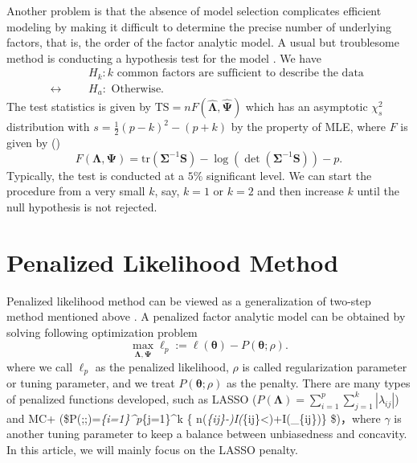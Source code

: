 \documentclass[
  a4paper,
  oneside,
  openany,
  12pt,
  onecolumn,
  twoside]{book}
\theoremstyle{plain}
\theoremstyle{remark}
\begin{document}
Another problem is that the absence of model selection complicates
efficient modeling by making it difficult to determine the precise
number of underlying factors, that is, the order of the factor analytic
model. A usual but troublesome method is conducting a hypothesis test
for the model \citep{mardiaMultivariateAnalysis1979}. We have
\begin{align*}
  &&&H_k: k \text{ common factors are sufficient to describe the data } \\
  \longleftrightarrow &&&H_a: \text{ Otherwise}.
\end{align*} The test statistics is given by
\(\text{TS}=nF(\hat{\boldsymbol{\Lambda}},\hat{\boldsymbol{\Psi}})\)
which has an asymptotic \(\chi^2_s\) distribution with
\(s=\frac{1}{2}(p-k)^2-(p+k)\) by the property of MLE, where \(F\) is
given by (\citet{mardiaMultivariateAnalysis1979}) \[
F(\boldsymbol{\Lambda},\boldsymbol{\Psi})=\text{tr}(\boldsymbol{\Sigma}^{-1}\boldsymbol{S})-\log(\det(\boldsymbol{\Sigma}^{-1}\boldsymbol{S}))-p.
\] Typically, the test is conducted at a \(5\%\) significant level. We
can start the procedure from a very small \(k\), say, \(k=1\) or \(k=2\)
and then increase \(k\) until the null hypothesis is not rejected.

\section{Penalized Likelihood Method}\label{penalized-likelihood-method}

Penalized likelihood method can be viewed as a generalization of
two-step method mentioned above
\citep{hiroseSparseEstimationNonconcave2015}. A penalized factor
analytic model can be obtained by solving following optimization problem
\[
 \max_{\boldsymbol{\Lambda},\boldsymbol{\Psi}}\ell_p := \ell(\boldsymbol{\theta})-P(\boldsymbol{\theta};\rho).
\] where we call \(\ell_p\) as the penalized likelihood, \(\rho\) is
called regularization parameter or tuning parameter, and we treat
\(P(\boldsymbol{\theta};\rho)\) as the penalty. There are many types of
penalized functions developed, such as LASSO
(\(P(\boldsymbol{\Lambda})=\sum_{i=1}^p\sum_{j=1}^k|\lambda_{ij}|\)) and
MC+
(\$P(\boldsymbol{\theta};\rho;\gamma)=\sum\emph{\{i=1\}\^{}p\sum}\{j=1\}\^{}k
\{
n(\textbar{}\lambda\emph{\{ij\}\textbar-)I(\textbar{}\lambda}\{ij\}\textbar\textless{}\rho\gamma)+I(\textbar{}\lambda\_\{ij\}\textbar{}\geq\rho\gamma)\}
\$)\citep{hiroseSparseEstimationNonconcave2015}，where \(\gamma\) is
another tuning parameter to keep a balance between unbiasedness and
concavity. In this article, we will mainly focus on the LASSO penalty.
\end{document}
